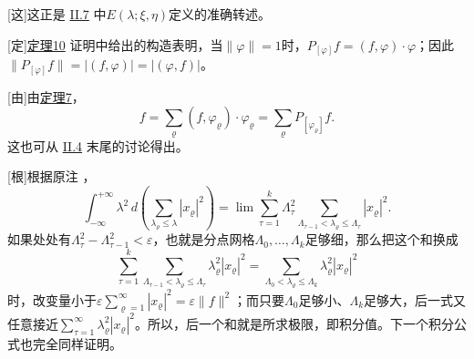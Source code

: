 \documentclass[fontsize=13pt,twoside,openany,headings=normal,parskip=false,bookmarkpackage=false,DIV=calc]{scrbook}
\begin{document}
[这]{这正是 \hyperref[sec:II.7]{II.7} 中$E(\lambda;\xi,\allowbreak \eta)$定义的准确转述。}

[定]{\hyperref[thm:II.10]{定理10} 证明中给出的构造表明，当$\lVert\varphi\rVert=1$时，$P_{[\varphi]}f=(f,\allowbreak \varphi)\cdot\varphi$；因此$\lVert P_{[\varphi]}f\rVert=|(f,\allowbreak \varphi)|=|(\varphi,\allowbreak f)|$。}

[由]{由\CJKglue \hyperref[thm:II.7]{定理7}，
\[
f=\sum_\varrho(f,\varphi_\varrho)\cdot\varphi_\varrho
=\sum_\varrho P_{[\varphi_\varrho]}f.
\]
这也可从 \hyperref[sec:II.4]{II.4} 末尾的讨论得出。}

[根]{根据原注 \hyperlink{note-73}{}，
\[
\int_{-\infty}^{+\infty}\lambda^2\,d\left(\sum_{\lambda_\varrho\le\lambda}|x_\varrho|^2\right)
=\lim\sum_{\tau=1}^{k}\Lambda_\tau^2
\sum_{\Lambda_{\tau-1}<\lambda_\varrho\le\Lambda_\tau}|x_\varrho|^2.
\]\hypertarget{origpage-245}{}\label{origpage-245}如果处处有$\Lambda_\tau^2-\Lambda_{\tau-1}^2<\varepsilon$，也就是分点网格$\Lambda_0,\allowbreak \ldots,\allowbreak \Lambda_k$足够细，那么把这个和换成
\[
\sum_{\tau=1}^{k}\sum_{\Lambda_{\tau-1}<\lambda_\varrho\le\Lambda_\tau}
\lambda_\varrho^2|x_\varrho|^2
=\sum_{\Lambda_0<\lambda_\varrho\le\Lambda_k}\lambda_\varrho^2|x_\varrho|^2
\]
时，改变量小于$\varepsilon\sum_{\varrho=1}^{\infty}|x_\varrho|^2=\varepsilon\lVert f\rVert^2$；而只要$\Lambda_0$足够小、$\Lambda_k$足够大，后一式又任意接近$\sum_{\tau=1}^{\infty}\lambda_\varrho^2|x_\varrho|^2$。所以，后一个和就是所求极限，即积分值。下一个积分公式也完全同样证明。}
\end{document}
